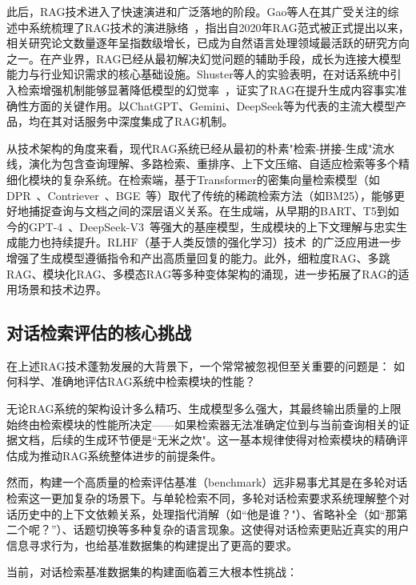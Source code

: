 此后，RAG技术进入了快速演进和广泛落地的阶段。Gao等人在其广受关注的综述中系统梳理了RAG技术的演进脉络~\citep{gao2024retrievalaugmented}，指出自2020年RAG范式被正式提出以来，相关研究论文数量逐年呈指数级增长，已成为自然语言处理领域最活跃的研究方向之一。在产业界，RAG已经从最初解决幻觉问题的辅助手段，成长为连接大模型能力与行业知识需求的核心基础设施。Shuster等人的实验表明，在对话系统中引入检索增强机制能够显著降低模型的幻觉率~\citep{shuster2021retrieval}，证实了RAG在提升生成内容事实准确性方面的关键作用。以ChatGPT、Gemini、DeepSeek等为代表的主流大模型产品，均在其对话服务中深度集成了RAG机制。

从技术架构的角度来看，现代RAG系统已经从最初的朴素"检索-拼接-生成"流水线，演化为包含查询理解、多路检索、重排序、上下文压缩、自适应检索等多个精细化模块的复杂系统。在检索端，基于Transformer的密集向量检索模型（如DPR~\citep{karpukhin-etal-2020-dense}、Contriever~\citep{izacard2022contriever}、BGE~\citep{xiao2023cpack}等）取代了传统的稀疏检索方法（如BM25），能够更好地捕捉查询与文档之间的深层语义关系。在生成端，从早期的BART、T5到如今的GPT-4~\citep{openai2023gpt4}、DeepSeek-V3~\citep{deepseekai2024deepseekv3}等强大的基座模型，生成模块的上下文理解与忠实生成能力也持续提升。RLHF（基于人类反馈的强化学习）技术~\citep{ouyang2022traininglanguagemodelsfollow}的广泛应用进一步增强了生成模型遵循指令和产出高质量回复的能力。此外，细粒度RAG、多跳RAG、模块化RAG、多模态RAG等多种变体架构的涌现，进一步拓展了RAG的适用场景和技术边界。

\subsection{对话检索评估的核心挑战}

在上述RAG技术蓬勃发展的大背景下，一个常常被忽视但至关重要的问题是： 如何科学、准确地评估RAG系统中检索模块的性能？

无论RAG系统的架构设计多么精巧、生成模型多么强大，其最终输出质量的上限始终由检索模块的性能所决定——如果检索器无法准确定位到与当前查询相关的证据文档，后续的生成环节便是``无米之炊"。这一基本规律使得对检索模块的精确评估成为推动RAG系统整体进步的前提条件。

然而，构建一个高质量的检索评估基准（benchmark）远非易事尤其是在多轮对话检索这一更加复杂的场景下。与单轮检索不同，多轮对话检索要求系统理解整个对话历史中的上下文依赖关系，处理指代消解（如``他是谁？"）、省略补全（如``那第二个呢？''）、话题切换等多种复杂的语言现象。这使得对话检索更贴近真实的用户信息寻求行为，也给基准数据集的构建提出了更高的要求。

当前，对话检索基准数据集的构建面临着三大根本性挑战：


